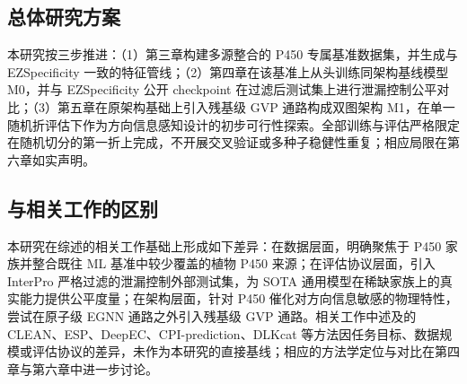 \subsection{总体研究方案}
\label{subsec:problem-plan}

本研究按三步推进：（1）第三章构建多源整合的 P450 专属基准数据集，并生成与 EZSpecificity 一致的特征管线；（2）第四章在该基准上从头训练同架构基线模型 M0，并与 EZSpecificity 公开 checkpoint 在过滤后测试集上进行泄漏控制公平对比；（3）第五章在原架构基础上引入残基级 GVP 通路构成双图架构 M1，在单一随机折评估下作为方向信息感知设计的初步可行性探索。全部训练与评估严格限定在随机切分的第一折上完成，不开展交叉验证或多种子稳健性重复；相应局限在第六章如实声明。

\subsection{与相关工作的区别}
\label{subsec:problem-diff}

本研究在综述的相关工作基础上形成如下差异：在数据层面，明确聚焦于 P450 家族并整合既往 ML 基准中较少覆盖的植物 P450 来源；在评估协议层面，引入 InterPro 严格过滤的泄漏控制外部测试集，为 SOTA 通用模型在稀缺家族上的真实能力提供公平度量；在架构层面，针对 P450 催化对方向信息敏感的物理特性，尝试在原子级 EGNN 通路之外引入残基级 GVP 通路。相关工作中述及的 CLEAN、ESP、DeepEC、CPI-prediction、DLKcat 等方法因任务目标、数据规模或评估协议的差异，未作为本研究的直接基线；相应的方法学定位与对比在第四章与第六章中进一步讨论。
